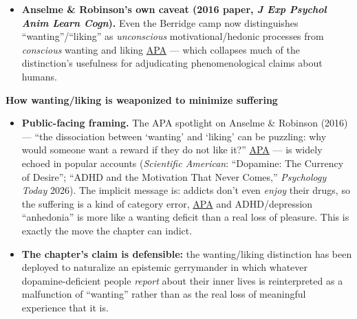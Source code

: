 \begin{itemize}
  \textbf{Salamone's effort-based critique.} Salamone \& Correa (2002, 2012, \emph{Neuron} 76:470--485, ``The mysterious motivational functions of mesolimbic dopamine''; 2024 \emph{Annual Review of Psychology} 75:1--32) \href{https://www.annualreviews.org/content/journals/10.1146/annurev-psych-020223-012208}{Annual Reviews} reframes the data: dopamine is not specifically about ``wanting'' vs.~``liking'' but about \emph{activational} aspects of motivation --- overcoming effort costs, vigor, persistence. \href{https://pmc.ncbi.nlm.nih.gov/articles/PMC2817983/}{PubMed Central} \href{https://www.annualreviews.org/content/journals/10.1146/annurev-psych-020223-012208}{Annual Reviews} This subtly undermines the cleanness of the Berridge dichotomy and is more compatible with the lived experience of dopamine deficiency: not ``I want it but don't like it'' but ``I cannot summon the activational substrate to engage.''
\item
  \textbf{Anselme \& Robinson's own caveat (2016 paper, \emph{J Exp Psychol Anim Learn Cogn}).} Even the Berridge camp now distinguishes ``wanting''/``liking'' as \emph{unconscious} motivational/hedonic processes from \emph{conscious} wanting and liking \href{https://www.apa.org/pubs/highlights/spotlight/issue-69}{APA} --- which collapses much of the distinction's usefulness for adjudicating phenomenological claims about humans.
\end{itemize}

\textbf{How wanting/liking is weaponized to minimize suffering}

\begin{itemize}
\tightlist
\item
  \textbf{Public-facing framing.} The APA spotlight on Anselme \& Robinson (2016) --- ``the dissociation between `wanting' and `liking' can be puzzling: why would someone want a reward if they do not like it?'' \href{https://www.apa.org/pubs/highlights/spotlight/issue-69}{APA} --- is widely echoed in popular accounts (\emph{Scientific American}: ``Dopamine: The Currency of Desire''; ``ADHD and the Motivation That Never Comes,'' \emph{Psychology Today} 2026). The implicit message is: addicts don't even \emph{enjoy} their drugs, so the suffering is a kind of category error, \href{https://www.apa.org/pubs/highlights/spotlight/issue-69}{APA} and ADHD/depression ``anhedonia'' is more like a wanting deficit than a real loss of pleasure. This is exactly the move the chapter can indict.
\item
  \textbf{The chapter's claim is defensible:} the wanting/liking distinction has been deployed to naturalize an epistemic gerrymander in which whatever dopamine-deficient people \emph{report} about their inner lives is reinterpreted as a malfunction of ``wanting'' rather than as the real loss of meaningful experience that it is.
\end{itemize}

